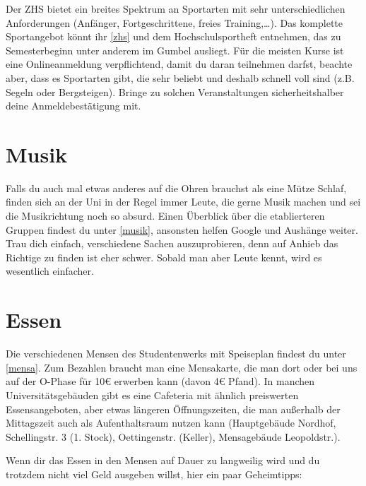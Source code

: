 Der ZHS bietet ein breites Spektrum an Sportarten mit sehr unterschiedlichen Anforderungen (Anfänger, Fortgeschrittene, freies Training,\ldots). Das komplette Sportangebot könnt ihr \ref{zhs} und dem Hochschulsportheft entnehmen, das zu Semesterbeginn unter anderem im Gumbel ausliegt. Für die meisten Kurse ist eine Onlineanmeldung verpflichtend, damit du daran teilnehmen darfst, beachte aber, dass es Sportarten gibt, die sehr beliebt und deshalb schnell voll sind (z.B. Segeln oder Bergsteigen). Bringe zu solchen Veranstaltungen sicherheitshalber deine Anmeldebestätigung mit.

\begin{urlList}
\end{urlList}

\section{Musik}
Falls du auch mal etwas anderes auf die Ohren brauchst als eine Mütze Schlaf, finden sich an der Uni in der Regel immer Leute, die gerne Musik machen und sei die Musikrichtung noch so absurd. Einen Überblick über die etablierteren Gruppen findest du unter \ref{musik}, ansonsten helfen Google und Aushänge weiter. Trau dich einfach, verschiedene Sachen auszuprobieren, denn auf Anhieb das Richtige zu finden ist eher schwer. Sobald man aber Leute kennt, wird es wesentlich einfacher.

\begin{urlList}
\end{urlList}


\section{Essen}

Die verschiedenen Mensen des Studentenwerks mit Speiseplan findest du unter \ref{mensa}. Zum Bezahlen braucht man eine Mensakarte, die man dort oder bei uns auf der O-Phase für 10€ erwerben kann (davon 4€ Pfand). In manchen Universitätsgebäuden gibt es eine Cafeteria mit ähnlich preiswerten Essensangeboten, aber etwas längeren Öffnungszeiten, die man außerhalb der Mittagszeit auch als Aufenthaltsraum nutzen kann (Hauptgebäude Nordhof, Schellingstr. 3 (1. Stock), Oettingenstr. (Keller), Mensagebäude Leopoldstr.).

Wenn dir das Essen in den Mensen auf Dauer zu langweilig wird und du trotzdem nicht viel Geld ausgeben willst, hier ein paar Geheimtipps:

